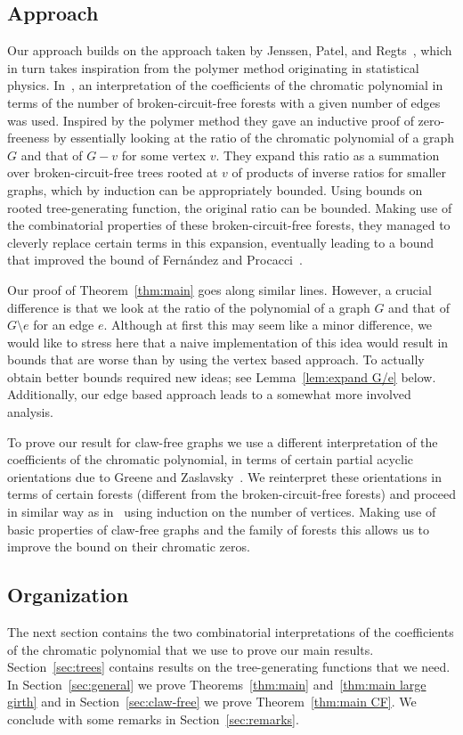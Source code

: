 \documentclass[a4paper,11pt,reqno]{amsart}
\numberwithin{equation}{section}
\begin{document}
\subsection*{Approach}
Our approach builds on the approach taken by Jenssen, Patel, and Regts~\cite{JPR24}, which in turn takes inspiration from the polymer method originating in statistical physics.
In~\cite{JPR24}, an interpretation of the coefficients of the chromatic polynomial in terms of the number of broken-circuit-free forests with a given number of edges was used.
Inspired by the polymer method they gave an inductive proof of zero-freeness by essentially looking at the ratio of the chromatic polynomial of a graph $G$ and that of $G-v$ for some vertex $v$. 
They expand this ratio as a summation over broken-circuit-free trees rooted at $v$ of products of inverse ratios for smaller graphs, which by induction can be appropriately bounded. 
Using bounds on rooted tree-generating function, the original ratio can be bounded.
Making use of the combinatorial properties of these broken-circuit-free forests, they managed to cleverly replace certain terms in this expansion, eventually leading to a bound that improved the bound of Fern\'andez and Procacci~\cite{Fernandez}.

Our proof of Theorem~\ref{thm:main} goes along similar lines. 
However, a crucial difference is that we look at the ratio of the polynomial of a graph $G$ and that of $G\setminus e$ for an edge $e$. 
Although at first this may seem like a minor difference, we would like to stress here that a naive implementation of this idea would result in bounds that are worse than by using the vertex based approach.
To actually obtain better bounds required new ideas; see Lemma~\ref{lem:expand G/e} below. 
Additionally, our edge based approach leads to a somewhat more involved analysis. 


To prove our result for claw-free graphs we use a different interpretation of the coefficients of the chromatic polynomial, in terms of certain partial acyclic orientations due to Greene and Zaslavsky~\cite{greene1983interpretation}. 
We reinterpret these orientations in terms of certain forests (different from the broken-circuit-free forests) and proceed in similar way as in~\cite{JPR24} using induction on the number of vertices. 
Making use of basic properties of claw-free graphs and the family of forests this allows us to improve the bound on their chromatic zeros.



\subsection*{Organization}
The next section contains the two combinatorial interpretations of the coefficients of the chromatic polynomial that we use to prove our main results. 
Section~\ref{sec:trees} contains results on the tree-generating functions that we need. 
In Section~\ref{sec:general} we prove Theorems~\ref{thm:main} and~\ref{thm:main large girth} and in Section~\ref{sec:claw-free} we prove Theorem~\ref{thm:main CF}. We conclude with some remarks in Section~\ref{sec:remarks}.
\end{document}
